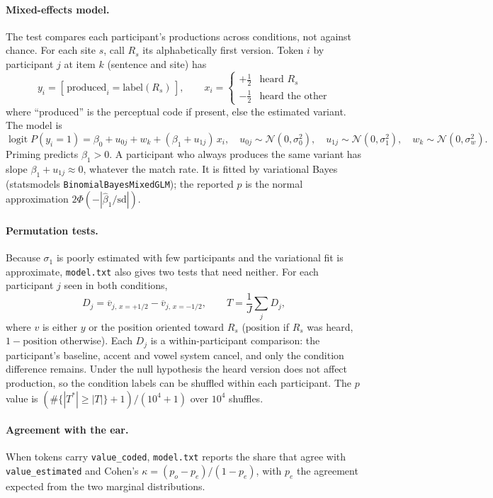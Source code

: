 \documentclass[11pt]{article}
\begin{document}
\paragraph{Mixed-effects model.} The test compares each participant's productions across conditions, not against chance. For each site $s$, call $R_s$ its alphabetically first version. Token $i$ by participant $j$ at item $k$ (sentence and site) has
\[
y_i = [\,\text{produced}_i = \text{label}(R_s)\,], \qquad
x_i = \begin{cases} +\tfrac12 & \text{heard } R_s \\ -\tfrac12 & \text{heard the other} \end{cases}
\]
where ``produced'' is the perceptual code if present, else the estimated variant. The model is
\[
\operatorname{logit} P(y_i = 1) = \beta_0 + u_{0j} + w_k + (\beta_1 + u_{1j})\,x_i,
\quad u_{0j}\sim\mathcal N(0,\sigma_0^2),\quad u_{1j}\sim\mathcal N(0,\sigma_1^2),\quad w_k\sim\mathcal N(0,\sigma_w^2).
\]
Priming predicts $\beta_1 > 0$. A participant who always produces the same variant has slope $\beta_1 + u_{1j} \approx 0$, whatever the match rate. It is fitted by variational Bayes (statsmodels \texttt{BinomialBayesMixedGLM}); the reported $p$ is the normal approximation $2\Phi(-|\hat\beta_1/\mathrm{sd}|)$.

\paragraph{Permutation tests.} Because $\sigma_1$ is poorly estimated with few participants and the variational fit is approximate, \texttt{model.txt} also gives two tests that need neither. For each participant $j$ seen in both conditions,
\[
D_j = \overline{v}_{j,\,x=+1/2} - \overline{v}_{j,\,x=-1/2}, \qquad T = \frac1J\sum_j D_j,
\]
where $v$ is either $y$ or the position oriented toward $R_s$ ($\text{position}$ if $R_s$ was heard, $1-\text{position}$ otherwise). Each $D_j$ is a within-participant comparison: the participant's baseline, accent and vowel system cancel, and only the condition difference remains. Under the null hypothesis the heard version does not affect production, so the condition labels can be shuffled within each participant. The $p$ value is $(\#\{|T^*| \ge |T|\}+1)/(10^4+1)$ over $10^4$ shuffles.

\paragraph{Agreement with the ear.} When tokens carry \texttt{value\_coded}, \texttt{model.txt} reports the share that agree with \texttt{value\_estimated} and Cohen's $\kappa = (p_o - p_e)/(1 - p_e)$, with $p_e$ the agreement expected from the two marginal distributions.
\end{document}
